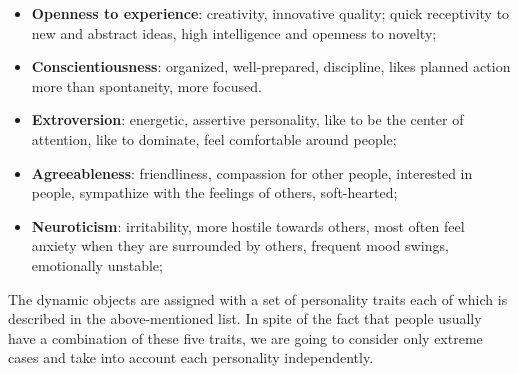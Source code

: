 \begin{itemize}\label{table:opennessFacets}
  \item  \textbf{Openness to experience}: creativity, innovative quality;
          quick receptivity to new and abstract ideas, high intelligence and openness to novelty;
  \item  \textbf{Conscientiousness}: organized, well-prepared, discipline, likes planned action more than spontaneity, more focused.
  \item  \textbf{Extroversion}: energetic, assertive personality, like to be the center of attention,
          like to dominate, feel comfortable around people;
  \item  \textbf{Agreeableness}: friendliness, compassion for other people, interested in people,
          sympathize with the feelings of others, soft-hearted;
  \item  \textbf{Neuroticism}:  irritability, more hostile towards others, most often feel anxiety
          when they are surrounded by others, frequent mood swings, emotionally unstable;
  \end{itemize}

The dynamic objects are assigned with a set of personality traits each of which
is described in the above-mentioned list.
In spite of the fact that people usually have a combination of these five traits,
we are going to consider only extreme cases and take into account each personality independently.
